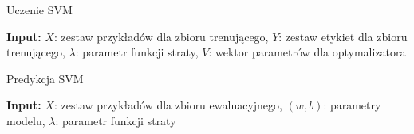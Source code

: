 \documentclass[
    left=2.5cm,         %
    right=2.5cm,        %
    top=2.5cm,          %
    bottom=3cm,         %
    bindingoffset=6mm,  %
    nohyphenation=false %
]{eiti/eiti-report}
\begin{document}
\begin{algorithm}
\caption{Uczenie SVM}\label{alg:cap}
\hspace*{\algorithmicindent} \textbf{Input:} \begin{math}\mathit{X}\end{math}: zestaw przykładów dla zbioru trenującego, \begin{math}\mathit{Y}\end{math}: zestaw etykiet dla zbioru trenującego, 
\begin{math}\lambda\end{math}: parametr funkcji straty, \begin{math}\mathit{V}\end{math}: wektor parametrów dla optymalizatora
\begin{algorithmic}[1]
\end{algorithmic}
\end{algorithm}

\begin{algorithm}
\caption{Predykcja SVM}\label{alg:cap}
\hspace*{\algorithmicindent} \textbf{Input:} \begin{math}\mathit{X}\end{math}: zestaw przykładów dla zbioru ewaluacyjnego,
\begin{math}\mathit{(w,b)}\end{math}: parametry modelu,
\begin{math}\lambda\end{math}: parametr funkcji straty
\begin{algorithmic}[1]
\end{algorithmic}
\end{algorithm}
\end{document}
